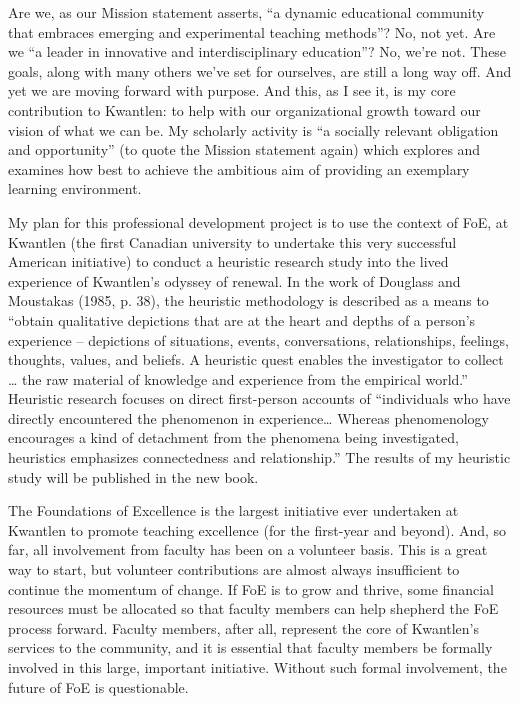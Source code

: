 \documentclass[letterpaper,10pt,headsepline]{scrreprt}
\begin{document}
Are we, as our Mission statement asserts, ``a dynamic educational community that embraces emerging and experimental teaching methods''? No, not yet. Are we ``a leader in innovative and interdisciplinary education''? No, we're not. These goals, along with many others we've set for ourselves, are still a long way off. And yet we are moving forward with purpose. And this, as I see it, is my core contribution to Kwantlen: to help with our organizational growth toward our vision of what we can be. My scholarly activity is ``a socially relevant obligation and opportunity'' (to quote the Mission statement again) which explores and examines how best to achieve the ambitious aim of providing an exemplary learning environment.

My plan for this professional development project is to use the context of FoE, at Kwantlen (the first Canadian university to undertake this very successful American initiative) to conduct a heuristic research study into the lived experience of Kwantlen's odyssey of renewal. In the work of Douglass and Moustakas (1985, p. 38), the heuristic methodology is described as a means to ``obtain qualitative depictions that are at the heart and depths of a person's experience -- depictions of situations, events, conversations, relationships, feelings, thoughts, values, and beliefs. A heuristic quest enables the investigator to collect \ldots{} the raw material of knowledge and experience from the empirical world.'' Heuristic research focuses on direct first-person accounts of ``individuals who have directly encountered the phenomenon in experience\ldots{} Whereas phenomenology encourages a kind of detachment from the phenomena being investigated, heuristics emphasizes connectedness and relationship.'' The results of my heuristic study will be published in the new book.

The Foundations of Excellence is the largest initiative ever undertaken at Kwantlen to promote teaching excellence (for the first-year and beyond). And, so far, all involvement from faculty has been on a volunteer basis. This is a great way to start, but volunteer contributions are almost always insufficient to continue the momentum of change. If FoE is to grow and thrive, some financial resources must be allocated so that faculty members can help shepherd the FoE process forward. Faculty members, after all, represent the core of Kwantlen's services to the community, and it is essential that faculty members be formally involved in this large, important initiative. Without such formal involvement, the future of FoE is questionable.
\end{document}
